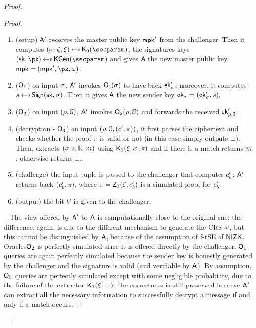 \begin{proof}
\begin{lemma}
\begin{proof}
            \begin{enumerate}
                \item (setup) $\mathsf{A}'$ receives the master public key $\mathsf{mpk}'$ from the challenger. Then it computes $(\crs,\tpsim,\tpext)\getsr\nizkext_0(\secparam)$, the signatures keys $(\sk, \pk) \getsr \kgen(\secparam)$ and gives $\mathsf{A}$ the new master public key $\mpk = (\mpk', \pk, \crs)$.
                \item ($\mathsf{O}_1$) on input $\sigma$, $\mathsf{A}'$ invokes $\mathsf{O}_1(\sigma)$ to have back $\mathsf{ek}'_\sigma$; moreover, it computes $\signature \getsr \sign(\sk, \sattr)$. Then it gives $\mathsf{A}$ the new sender key $\mathsf{ek}_\sigma = (\mathsf{ek}'_\sigma, s)$.
                \item ($\mathsf{O}_2$) on input $(\rho, \mathbb{S})$, $\mathsf{A}'$ invokes $\mathsf{O}_2(\rho, \mathbb{S})$ and forwards the received $\mathsf{ek}'_{\rho, \mathbb{S}}$.
                \item (decryption - $\mathsf{O}_3$) on input $(\rho, \mathbb{S}, (c', \pi))$, it first parses the ciphertext and checks whether the proof $\pi$ is valid or not (in this case simply outputs $\bot$). Then, extracts $(\sigma, s, \mathbb{R}, m)$ using $\mathsf{K}_1(\xi,c',\pi)$ and if there is a match returns $m$, otherwise returns $\bot$.
                \item (challenge) the input tuple is passed to the challenger that computes $c'_b$; $\mathsf{A}'$ returns back $(c'_b, \pi)$, where $\pi = \mathsf{Z}_1(\zeta, c'_b)$ is a simulated proof for $c'_b$.
                \item (output) the bit $b'$ is given to the challenger.
            \end{enumerate}
            ~\newline
            The view offered by $\mathsf{A}'$ to $\mathsf{A}$ is computationally close to the original one: the difference, again, is due to the different mechanism to generate the CRS $\omega$, but this cannot be distinguished by $\mathsf{A}$, because of the assumption of f-tSE of $\mathsf{NIZK}$.
            Oracles$\mathsf{O}_2$ is perfectly simulated since it is offered directly by the challenger.
            $\mathsf{O}_1$ queries are again perfectly simulated because the sender key is honestly generated by the challenger and the signature is valid (and verifiable by $\mathsf{A}$).
            By assumption, $\mathsf{O}_3$ queries are perfectly simulated except with some negligible probability, due to the failure of the extractor $\mathsf{K}_1(\xi, \cdot, \cdot)$: the correctness is still preserved because $\mathsf{A}'$ can extract all the necessary information to successfully decrypt a message if and only if a match occurs.
        \end{proof}
    \end{lemma}


\end{proof}
